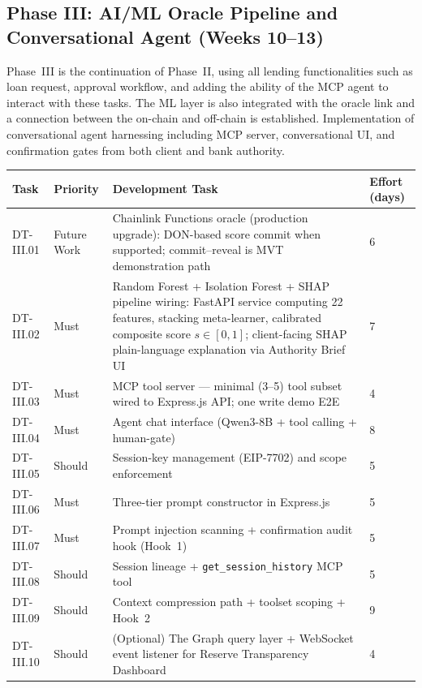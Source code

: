 \documentclass[12pt,a4paper]{report}
\newcommand{\tableheadcolor}{\rowcolor{TableHeadBg}}
\begin{document}
\subsection{Phase III: AI/ML Oracle Pipeline and Conversational Agent (Weeks 10--13)}

Phase~III is the continuation of Phase~II, using all lending functionalities such as loan request, approval workflow, and adding the ability of the MCP agent to interact with these tasks. The ML layer is also integrated with the oracle link and a connection between the on-chain and off-chain is established. Implementation of conversational agent harnessing including MCP server, conversational UI, and confirmation gates from both client and bank authority.

\begin{table}[H]
\centering
\begin{tabular}{p{1.8cm}p{1.8cm}p{7.5cm}p{1.5cm}}
\toprule
\tableheadcolor
\textbf{Task} & \textbf{Priority} & \textbf{Development Task} & \textbf{Effort (days)} \\
\midrule
DT-III.01 & Future Work & Chainlink Functions oracle (production upgrade): DON-based score commit when supported; commit--reveal is MVT demonstration path & 6 \\
DT-III.02 & Must & Random Forest + Isolation Forest + SHAP pipeline wiring: FastAPI service computing 22 features, stacking meta-learner, calibrated composite score $s \in [0,1]$; client-facing SHAP plain-language explanation via Authority Brief UI & 7 \\
DT-III.03 & Must & MCP tool server --- minimal (3--5) tool subset wired to Express.js API; one write demo E2E & 4 \\
DT-III.04 & Must & Agent chat interface (Qwen3-8B + tool calling + human-gate) & 8 \\
DT-III.05 & Should & Session-key management (EIP-7702) and scope enforcement & 5 \\
DT-III.06 & Must & Three-tier prompt constructor in Express.js & 5 \\
DT-III.07 & Must & Prompt injection scanning + confirmation audit hook (Hook~1) & 5 \\
DT-III.08 & Should & Session lineage + \texttt{get\_session\_history} MCP tool & 5 \\
DT-III.09 & Should & Context compression path + toolset scoping + Hook~2 & 9 \\
DT-III.10 & Should & (Optional) The Graph query layer + WebSocket event listener for Reserve Transparency Dashboard & 4 \\

\end{tabular}
\end{table}
\end{document}
